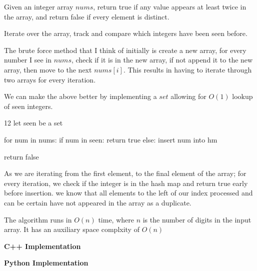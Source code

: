 
\label{prob:lc-217-contains-duplicate}

\ProblemSummary
Given an integer array $nums$, return true if any value appears at least twice in the array, and return false if every element is distinct.

\KeyIdea
Iterate over the array, track and compare which integers have been seen before.

\begin{Thinking}
    The brute force method that I think of initially is create a new array, for every number I see in $nums$, check if it is in the new array, if not append it to the new array, then move to the next $nums[i]$. This results in having to iterate through two arrays for every iteration. 

    We can make the above better by implementing a $set$ allowing for \(O(1)\) lookup of seen integers.
\end{Thinking}

\Algorithm
\begin{CodeBlock}[style=pseudo,caption={Pseudocode}]{12}
  let seen be a set

  for num in nums:
    if num in seen:
      return true
    else:
      insert num into hm

  return false
\end{CodeBlock}

\Correctness
As we are iterating from the first element, to the final element of the array; for every iteration, we check if the integer is in the hash map and return true early before insertion. we know that all elements to the left of our index processed and can be certain have not appeared in the array as a duplicate.

\Complexity
The algorithm runs in \(O(n)\) time, where \(n\) is the number of digits in the input array. It has an auxiliary space complxity of \(O(n)\) 

\bigskip
\noindent\textbf{C++ Implementation}



\bigskip
\noindent\textbf{Python Implementation}



\ProblemDivider
